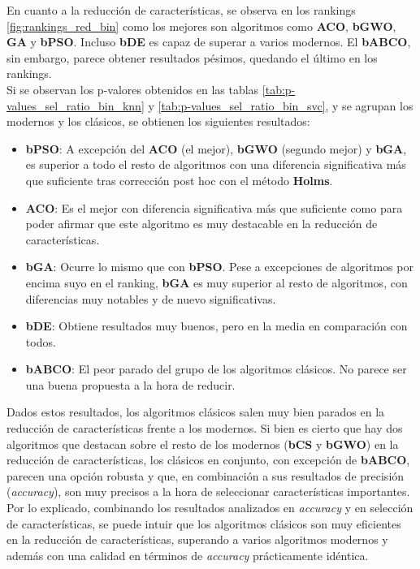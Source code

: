 En cuanto a la reducción de características, se observa en los rankings \ref{fig:rankings_red_bin} como los mejores son algoritmos como \textbf{ACO}, \textbf{bGWO}, \textbf{GA} y \textbf{bPSO}. Incluso \textbf{bDE} es capaz de superar a varios modernos. El \textbf{bABCO}, sin embargo, parece obtener resultados pésimos, quedando el último en los rankings.\\[6pt]
Si se observan los p-valores obtenidos en las tablas \ref{tab:p-values_sel_ratio_bin_knn} y \ref{tab:p-values_sel_ratio_bin_svc}, y se agrupan los modernos y los clásicos, se obtienen los siguientes resultados:
\begin{itemize}
    \item \textbf{bPSO}: A excepción del \textbf{ACO} (el mejor), \textbf{bGWO} (segundo mejor) y \textbf{bGA}, es superior a todo el resto de algoritmos con una diferencia significativa más que suficiente tras corrección post hoc con el método \textbf{Holms}.
    \item \textbf{ACO}: Es el mejor con diferencia significativa más que suficiente como para poder afirmar que este algoritmo es muy destacable en la reducción de características.
    \item \textbf{bGA}: Ocurre lo mismo que con \textbf{bPSO}. Pese a excepciones de algoritmos por encima suyo en el ranking, \textbf{bGA} es muy superior al resto de algoritmos, con diferencias muy notables y de nuevo significativas.
    \item \textbf{bDE}: Obtiene resultados muy buenos, pero en la media en comparación con todos.
    \item \textbf{bABCO}: El peor parado del grupo de los algoritmos clásicos. No parece ser una buena propuesta a la hora de reducir.
\end{itemize}

Dados estos resultados, los algoritmos clásicos salen muy bien parados en la reducción de características frente a los modernos. Si bien es cierto que hay dos algoritmos que destacan sobre el resto de los modernos (\textbf{bCS} y \textbf{bGWO}) en la reducción de características, los clásicos en conjunto, con excepción de \textbf{bABCO}, parecen una opción robusta y que, en combinación a sus resultados de precisión (\textit{accuracy}), son muy precisos a la hora de seleccionar características importantes. \\[6pt]

Por lo explicado, combinando los resultados analizados en \textit{accuracy} y en selección de características, se puede intuir que los algoritmos clásicos son muy eficientes en la reducción de características, superando a varios algoritmos modernos y además con una calidad en términos de \textit{accuracy} prácticamente idéntica.

